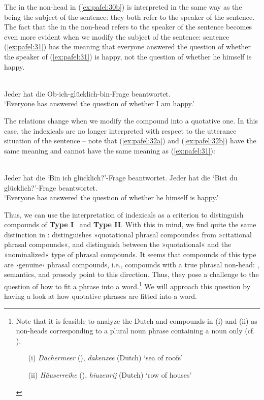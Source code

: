 \documentclass[output=paper]{LSP/langsci}
\begin{document}
The  in the non-head in (\ref{ex:pafel:30b}) is interpreted in the same way as the  being the subject of the sentence: they both refer to the speaker of the sentence. The fact that the  in the non-head refers to the speaker of the sentence becomes even more evident when we modify the subject of the sentence: sentence (\ref{ex:pafel:31}) has the meaning that everyone answered the question of whether the speaker of (\ref{ex:pafel:31}) is happy, not the question of whether he himself is happy.

\ea\label{ex:pafel:31}
      \\
         Jeder hat die Ob-ich-glücklich-bin-Frage beantwortet.  \\
      \glt  `Everyone has answered the question of whether I am happy.'
\z

The relations change when we modify the compound into a quotative one. In this case, the indexicals are no longer interpreted with respect to the utterance situation of the sentence – note that (\ref{ex:pafel:32a}) and (\ref{ex:pafel:32b}) have the same meaning and cannot have the same meaning as (\ref{ex:pafel:31}):

\ea
      \\
      \ea\label{ex:pafel:32a}      
        Jeder hat die `Bin ich glücklich?'-Frage beantwortet. 
      \ex\label{ex:pafel:32b}
         Jeder hat die `Bist du glücklich?'-Frage beantwortet. \\
      \glt  `Everyone has answered the question of whether he himself is happy.'
    \z
\z      

Thus, we can use the interpretation of indexicals as a criterion to distinguish compounds of \textbf{Type I }\ and \textbf{Type II}. With this in mind, we find quite the same distinction in : \citet{Goksel2015} distinguishes »quotational phrasal compounds« from »citational phrasal compounds«, and \citet[305]{TK15} distinguish between the »quotational« and the »nominalized«  type of phrasal compounds.  \largerpage[2]
It seems that compounds of this type are ›genuine‹ phrasal compounds, i.e., compounds with a true phrasal non-head: , semantics, and prosody point to this direction. Thus, they pose a challenge to the question of how to fit a phrase into a word.\footnote{Note that it is feasible to analyze the Dutch and  compounds in (i) and (ii) as non-heads corresponding to a plural noun phrase containing a noun only (cf. \citealt[147]{Booij2002}).

\begin{enumerate}
 \item[(i)]  \textit{Dächermeer} (), \textit{dakenzee} (Dutch) `sea of roofs'
 \item[(ii)] \textit{Häuserreihe} (), \textit{hiuzenrij} (Dutch) `row of houses'
\end{enumerate}}
We will approach this question by having a look at how quotative phrases are fitted into a word. 
\end{document}
